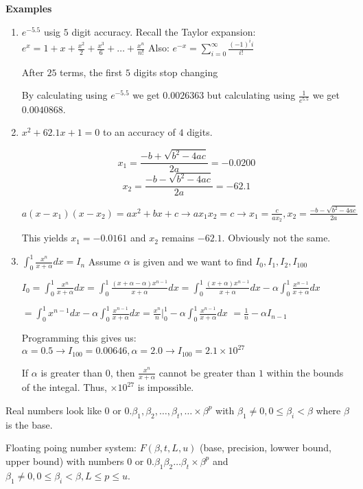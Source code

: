 \documentclass{article}
\begin{document}
\textbf{Examples}
\begin{enumerate}
	\item $e^{-5.5}$ usig $5$ digit accuracy.
		Recall the Taylor expansion:
		$e^x = 1 + x + \frac{x^2}{2} + \frac{x^3}{6}  + \dots + \frac{x^n}{n!}$
		Also:
		$e^{-x} = \sum_{i=0}^{\infty} \frac{(-1)^ii}{i!}$

		After $25$ terms, the first $5$ digits stop changing

		By calculating using $e^{-5.5}$ we get $0.0026363$ but calculating using $\frac{1}{e^{5.5}}$ we get $0.0040868$.

	\item $x^2 + 62.1x + 1 = 0$ to an accuracy of $4$ digits.

		$$x_1 = \frac{-b + \sqrt{b^2 - 4ac}}{2a} = -0.0200$$
		$$x_2 = \frac{-b - \sqrt{b^2 - 4ac}}{2a} = -62.1$$

		$a(x-x_1)(x-x_2) = ax^2+bx+c \rightarrow ax_1x_2 = c \rightarrow x_1 = \frac{c}{ax_2}, x_2 = \frac{-b - \sqrt{b^2 - 4ac}}{2a}$

		This yields $x_1 = -0.0161$ and $x_2$ remains $-62.1$. Obviously not the same.

	\item $\int_0^1 \frac{x^n}{x+ \alpha} dx = I_n$ Assume $\alpha$ is given and we want to find $I_0, I_1, I_2, I_100$

		$I_0 = \int_0^1 \frac{x^n}{x+ \alpha} dx  = \int_0^1 \frac{(x + \alpha - \alpha) x^{n-1}}{x+\alpha}dx = \int_0^1 \frac{(x + \alpha)x^{n-1}}{x + \alpha}dx - \alpha \int_0^1 \frac{x^{n-1}}{x + \alpha}dx$

		$= \int_0^1 x^{n-1} dx - \alpha \int_0^1 \frac{x^{n-1}}{x + \alpha}dx = \frac{x^n}n |_0^1 - \alpha \int_0^1 \frac{x^{n-1}}{x + \alpha}dx $ %
		$ = \frac{1}n - \alpha I_{n-1}$

		Programming this gives us:
		$\alpha = 0.5 \rightarrow I_{100} = 0.00646, \alpha = 2.0 \rightarrow I_{100} = 2.1 \times 10^{27}$

		If $\alpha$ is greater than $0$, then $\frac{x^n}{x + \alpha}$ cannot be greater than $1$ within the bounds of the integal. Thus, $\times 10^{27}$ is impossible.

\end{enumerate}

Real numbers look like $0$ or $0.\beta_1, \beta_2, \dots , \beta_t, \dots \times \beta^p$ with $\beta_1 \neq 0, 0 \leq \beta_i < \beta$ where $\beta$ is the base.

Floating poing number system: $F(\beta, t, L, u)$ (base, precision, lowwer bound, upper bound) with numbers $0$ or $0.\beta_1 \beta_2 \dots \beta_t \times \beta^p$ and $\beta_1 \neq 0, 0 \leq \beta_i < \beta, L \leq p \leq u$.
\end{document}
